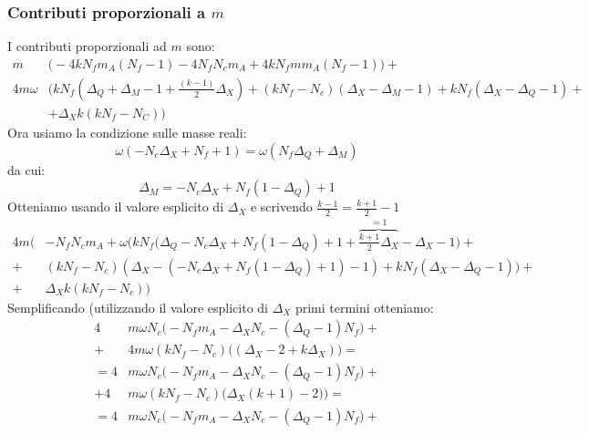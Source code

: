 \documentclass[a4paper,12pt]{article}
\begin{document}
\subsubsection{Contributi proporzionali a $m$}
I contributi proporzionali ad $m$ sono:
\begin{align*}
 m  &\bigg( - 4 k N_f m_A ( N_f -1) - 4 N_f N_c m_A   + 4 k N_f m m_A (N_f -1)\bigg)  + \\
  4 m \omega &  \bigg(   k N_f( \Delta_Q + \Delta_M -1 + \frac{(k-1)}{2} \Delta_X )  + (k N_f -N_c) ( \Delta_X - \Delta_M - 1) + k N_f ( \Delta_X - \Delta_Q -1) + \\
  & +  \Delta_X  k ( k N_f - N_C) \bigg)
 \end{align*}
Ora usiamo la condizione sulle masse reali:
\begin{equation}
	\omega ( - N_c \Delta_X + N_f + 1  ) = \omega ( N_f \Delta_Q + \Delta_M)
\end{equation}
da cui:
\begin{equation}
	\Delta_M = -N_c \Delta_X + N_f ( 1 - \Delta_Q) + 1
\end{equation}
Otteniamo usando il valore esplicito di $\Delta_X$ e scrivendo $ \frac{k-1}{2} = \frac{k+1}{2} - 1$
\begin{align*}
  4m \bigg(& -   N_f N_c m_A  +   \omega \big( k N_f ( \Delta_Q - N_c \Delta_X + N_f ( 1 - \Delta_Q)+ 1 + \overbrace{\frac{k+1}{2}\Delta_X}^{=1} - \Delta_X  -1 \big)  + \\
+& (k N_f -N_c) ( \Delta_X -( - N_c \Delta_X + N_f( 1-\Delta_Q) +1) - 1) +  k N_f (  \Delta_X -\Delta_Q - 1) \big)+ \\
+ &  \Delta_X  k ( k N_f - N_c)  \bigg)
\end{align*}
Semplificando (utilizzando il valore esplicito di $\Delta_X$ primi termini otteniamo:
\begin{align*}
 4 & m \omega N_c \bigg(   -   N_f  m_A
 -\Delta_{X} N_{c} - {\left(\Delta_{Q} - 1\right)} N_{f} \bigg) + \\
 + & 4 m \omega (k N_f - N_c) \bigg(
(\Delta_X - 2 + k \Delta_X )   \bigg)  = \\
= 4 & m \omega N_c \bigg(    -   N_f  m_A
 -\Delta_{X} N_{c} - {\left(\Delta_{Q} - 1\right)} N_{f} \bigg) + \\
 + 4 & m \omega ( k N_f - N_c) \bigg( \Delta_X ( k+1) -2 ) \bigg) = \\
 = 4 & m \omega N_c \bigg(    -   N_f  m_A
 -\Delta_{X} N_{c} - {\left(\Delta_{Q} - 1\right)} N_{f} \bigg) + \\
\end{align*}
\end{document}
